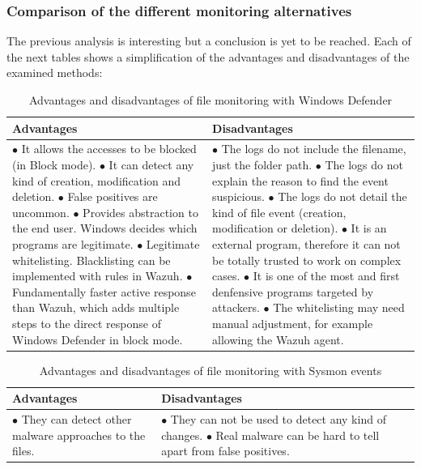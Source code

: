 \subsubsection{Comparison of the different monitoring alternatives}
The previous analysis is interesting but a conclusion is yet to be reached.
Each of the next tables shows a simplification of the advantages and disadvantages of the examined methods:
\begin{table}[H]
	\begin{tabularx}{\textwidth}{|w|w|}
		\hline
		Advantages & Disadvantages\\ \hline
			$\bullet$ It allows the accesses to be blocked (in Block mode).
			\linej $\bullet$ It can detect any kind of creation, modification and deletion.
			\linej $\bullet$ False positives are uncommon.
			\linej $\bullet$ Provides abstraction to the end user. Windows decides which programs are legitimate.
			\linej $\bullet$ Legitimate whitelisting. Blacklisting can be implemented with rules in Wazuh.
			\linej $\bullet$ Fundamentally faster active response than Wazuh, which adds multiple steps to the direct response of Windows Defender in block mode.
		&
			$\bullet$ The logs do not include the filename, just the folder path.
			\linej $\bullet$ The logs do not explain the reason to find the event suspicious.
			\linej $\bullet$ The logs do not detail the kind of file event (creation, modification or deletion).
			\linej $\bullet$ It is an external program, therefore it can not be totally trusted to work on complex cases.
			\linej $\bullet$ It is one of the most and first denfensive programs targeted by attackers.
			\linej $\bullet$ The whitelisting may need manual adjustment, for example allowing the Wazuh agent.
			\\ \hline
	\end{tabularx}
	\caption{Advantages and disadvantages of file monitoring with Windows Defender}
\end{table}

\begin{table}[H]
	\begin{tabularx}{\textwidth}{|w|w|}
		\hline
		Advantages & Disadvantages\\ \hline
			$\bullet$ They can detect other malware approaches to the files.
		&
			$\bullet$ They can not be used to detect any kind of changes.
			\linej $\bullet$ Real malware can be hard to tell apart from false positives.
			\\ \hline
	\end{tabularx}
	\caption{Advantages and disadvantages of file monitoring with Sysmon events}
\end{table}

